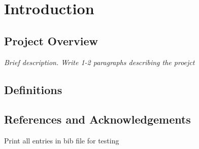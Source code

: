 
\section{Introduction}\label{sec:introduction}

    \subsection{Project Overview}
        \emph{Brief description. Write 1-2 paragraphs describing the proejct}

    \subsection{Definitions}\label{sec:definitions}
        \printnoidxglossary
        \printnoidxglossary[type=acronym, title=Acronyms and Abbreviations]
        \printacronyms

    \subsection{References and Acknowledgements}\label{sec:references}
        Print all entries in bib file for testing
        \nocite{*}
        \printbibliography[heading=none]

